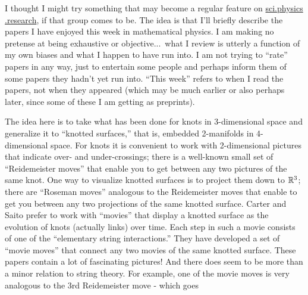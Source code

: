 
I thought I might try something that may become a regular feature on \href{http://www.astro.multivax.de:8000/spr/spr.html}{sci.physics .research}, if that group comes to be. The idea is that I'll briefly describe the papers I have enjoyed this week in mathematical physics. I am making no pretense at being exhaustive or objective...\ what I review is utterly a function of my own biases and what I happen to have run into. I am not trying to ``rate'' papers in any way, just to entertain some people and perhaps inform them of some papers they hadn't yet run into. ``This week'' refers to when I read the papers, not when they appeared (which may be much earlier or also perhaps later, since some of these I am getting as preprints).


The idea here is to take what has been done for knots in 3-dimensional space and generalize it to ``knotted surfaces,'' that is, embedded 2-manifolds in 4-dimensional space. For knots it is convenient to work with 2-dimensional pictures that indicate over- and under-crossings; there is a well-known small set of ``Reidemeister moves'' that enable you to get between any two pictures of the same knot. One way to visualize knotted surfaces is to project them down to $\mathbb R^3$; there are ``Roseman moves'' analogous to the Reidemeister moves that enable to get you between any two projections of the same knotted surface. Carter and Saito prefer to work with ``movies'' that display a knotted surface as the evolution of knots (actually links) over time. Each step in such a movie consists of one of the ``elementary string interactions.'' They have developed a set of ``movie moves'' that connect any two movies of the same knotted surface. These papers contain a lot of fascinating pictures! And there does seem to be more than a minor relation to string theory. For example, one of the movie moves is very analogous to the 3rd Reidemeister move - which goes


